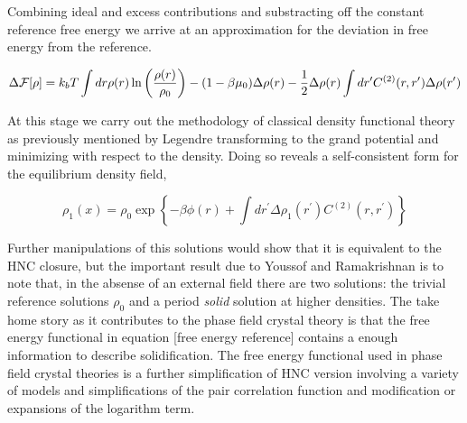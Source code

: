 Combining ideal and excess contributions and substracting off the constant reference free energy we arrive at an approximation for the deviation in free energy from the reference. 

\begin{equation}
    \Delta \mathcal{F} [\rho] = k_b T \int dr \rho(r) \ln\left(\frac{\rho(r)}{\rho_0}\right) -(1-\beta\mu_0) \Delta \rho(r) - \frac{1}{2}\Delta \rho(r) \int dr^\prime C^{(2)}(r, r^\prime) \Delta \rho(r^\prime)
\end{equation}

At this stage we carry out the methodology of classical density functional theory as previously mentioned by Legendre transforming to the grand potential and minimizing with respect to the density. Doing so reveals a self-consistent form for the equilibrium density field, 

\begin{equation}
    \rho_1(x) = \rho_0 \exp\left\lbrace-\beta\phi(r) + \int dr^\prime \Delta\rho_1(r^\prime) C^{(2)}(r, r^\prime)\right\rbrace
\end{equation}

Further manipulations of this solutions would show that it is equivalent to the HNC closure, but the important result due to Youssof and Ramakrishnan is to note that, in the absense of an external field there are two solutions: the trivial reference solutions $\rho_0$ and a period \textit{solid} solution at higher densities. The take home story as it contributes to the phase field crystal theory is that the free energy functional in equation [free energy reference] contains a enough information to describe solidification. The free energy functional used in phase field crystal theories is a further simplification of HNC version involving a variety of models and simplifications of the pair correlation function and modification or expansions of the logarithm term.